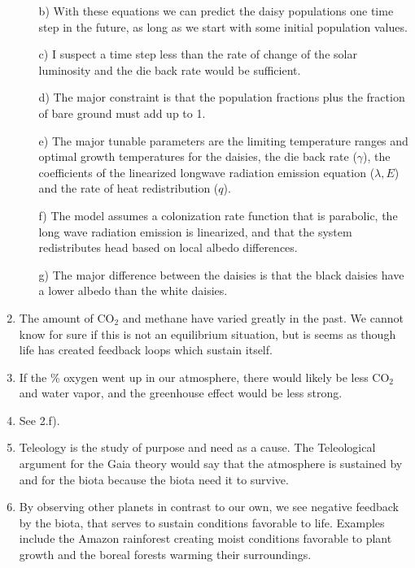 \documentclass[11pt,oneside]{article}
\begin{document}
\begin{enumerate}
\begin{enumerate}
\item[b)]  With these equations we can predict the daisy populations one time step in the future, as long as we start with some initial population values. 

\item[c)] I suspect a time step less than the rate of change of the solar luminosity and the die back rate would be sufficient. 

\item[d)] The major constraint is that the population fractions plus the fraction of bare ground must add up to 1. 

\item[e)] The major tunable parameters are the limiting temperature ranges and optimal growth temperatures for the daisies, the die back rate ($\gamma$), the coefficients of the linearized longwave radiation emission equation ($\lambda, E$) and the rate of heat redistribution ($q$). 

\item[f)] The model assumes a colonization rate function that is parabolic, the long wave radiation emission is linearized, and that the system redistributes head based on local albedo differences. 

\item[g)] The major difference between the daisies is that the black daisies have a lower albedo than the white daisies. 
\end{enumerate}

\item The amount of CO$_2$ and methane have varied greatly in the past.  We cannot know for sure if this is not an equilibrium situation, but is seems as though life has created feedback loops which sustain itself. 

\item If the \% oxygen went up in our atmosphere, there would likely be less CO$_2$ and water vapor, and the greenhouse effect would be less strong. 

\item See 2.f).

\item Teleology is the study of purpose and need as a cause.   The Teleological argument for the Gaia theory would say that the atmosphere is sustained by and for the biota because the biota need it to survive.

\item By observing other planets in contrast to our own, we see negative feedback by the biota, that serves to sustain conditions favorable to life.  Examples include the Amazon rainforest creating moist conditions favorable to plant growth and the boreal forests warming their surroundings. 


\end{enumerate}
\end{document}
